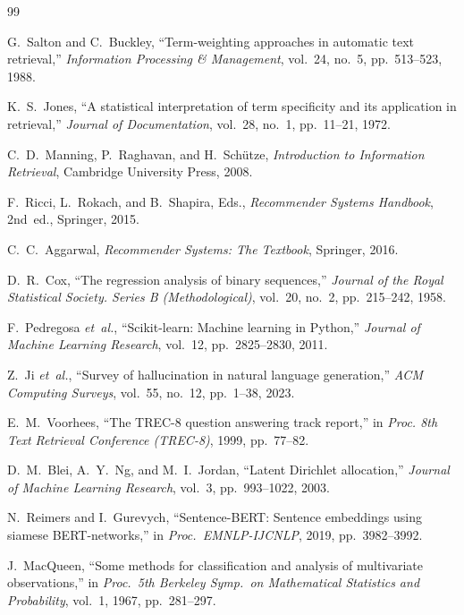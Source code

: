 \documentclass[10pt, journal, twocolumn]{IEEEtran}
\begin{document}
\begin{thebibliography}{99}

G.~Salton and C.~Buckley, ``Term-weighting approaches in automatic text retrieval,'' \emph{Information Processing \& Management}, vol.~24, no.~5, pp.~513--523, 1988.

K.~S.~Jones, ``A statistical interpretation of term specificity and its application in retrieval,'' \emph{Journal of Documentation}, vol.~28, no.~1, pp.~11--21, 1972.

C.~D.~Manning, P.~Raghavan, and H.~Sch\"{u}tze, \emph{Introduction to Information Retrieval}, Cambridge University Press, 2008.

F.~Ricci, L.~Rokach, and B.~Shapira, Eds., \emph{Recommender Systems Handbook}, 2nd~ed., Springer, 2015.

C.~C.~Aggarwal, \emph{Recommender Systems: The Textbook}, Springer, 2016.

D.~R.~Cox, ``The regression analysis of binary sequences,'' \emph{Journal of the Royal Statistical Society. Series B (Methodological)}, vol.~20, no.~2, pp.~215--242, 1958.

F.~Pedregosa \emph{et~al.}, ``Scikit-learn: Machine learning in Python,'' \emph{Journal of Machine Learning Research}, vol.~12, pp.~2825--2830, 2011.

Z.~Ji \emph{et~al.}, ``Survey of hallucination in natural language generation,'' \emph{ACM Computing Surveys}, vol.~55, no.~12, pp.~1--38, 2023.

E.~M.~Voorhees, ``The TREC-8 question answering track report,'' in \emph{Proc. 8th Text Retrieval Conference (TREC-8)}, 1999, pp.~77--82.

D.~M.~Blei, A.~Y.~Ng, and M.~I.~Jordan, ``Latent Dirichlet allocation,'' \emph{Journal of Machine Learning Research}, vol.~3, pp.~993--1022, 2003.

N.~Reimers and I.~Gurevych, ``Sentence-BERT: Sentence embeddings using siamese BERT-networks,'' in \emph{Proc.\ EMNLP-IJCNLP}, 2019, pp.~3982--3992.

J.~MacQueen, ``Some methods for classification and analysis of multivariate observations,'' in \emph{Proc.\ 5th Berkeley Symp.\ on Mathematical Statistics and Probability}, vol.~1, 1967, pp.~281--297.


\end{thebibliography}
\end{document}
